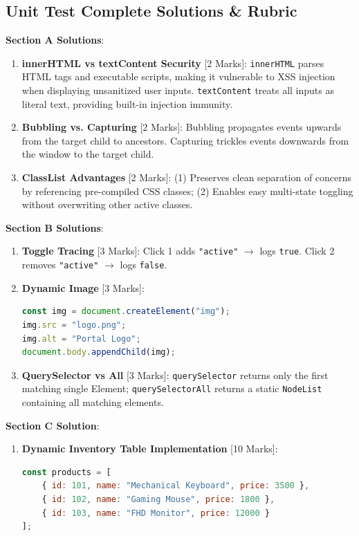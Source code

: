 \subsection{Unit Test Complete Solutions \& Rubric}

\begin{solutionbox}
\noindent\textbf{Section A Solutions}:
\begin{enumerate}
    \item \textbf{innerHTML vs textContent Security} [2 Marks]: \texttt{innerHTML} parses HTML tags and executable scripts, making it vulnerable to XSS injection when displaying unsanitized user inputs. \texttt{textContent} treats all inputs as literal text, providing built-in injection immunity.
    \item \textbf{Bubbling vs. Capturing} [2 Marks]: Bubbling propagates events upwards from the target child to ancestors. Capturing trickles events downwards from the window to the target child.
    \item \textbf{ClassList Advantages} [2 Marks]: (1) Preserves clean separation of concerns by referencing pre-compiled CSS classes; (2) Enables easy multi-state toggling without overwriting other active classes.
\end{enumerate}

\noindent\textbf{Section B Solutions}:
\begin{enumerate}[start=4]
    \item \textbf{Toggle Tracing} [3 Marks]: Click 1 adds \texttt{"active"} $\to$ logs \texttt{true}. Click 2 removes \texttt{"active"} $\to$ logs \texttt{false}.
    \item \textbf{Dynamic Image} [3 Marks]:
\begin{lstlisting}[language=JavaScript]
const img = document.createElement("img");
img.src = "logo.png";
img.alt = "Portal Logo";
document.body.appendChild(img);
\end{lstlisting}
    \item \textbf{QuerySelector vs All} [3 Marks]: \texttt{querySelector} returns only the first matching single Element; \texttt{querySelectorAll} returns a static \texttt{NodeList} containing all matching elements.
\end{enumerate}

\noindent\textbf{Section C Solution}:
\begin{enumerate}[start=7]
    \item \textbf{Dynamic Inventory Table Implementation} [10 Marks]:
\begin{lstlisting}[language=JavaScript]
const products = [
    { id: 101, name: "Mechanical Keyboard", price: 3500 },
    { id: 102, name: "Gaming Mouse", price: 1800 },
    { id: 103, name: "FHD Monitor", price: 12000 }
];


\end{lstlisting}
\end{enumerate}
\end{solutionbox}
